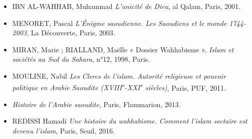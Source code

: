 \begin{itemize}
\item
 
  IBN AL-WAHHAB, Muhammad \emph{L'unicité de Dieu}, al Qalam, Paris,
  2001.
 


 \item
MENORET, Pascal \emph{L'Énigme saoudienne. Les Saoudiens et le monde
1744-2003}, La Découverte, Paris, 2003.
\item
MIRAN, Marie ; RIALLAND, Maëlle « Dossier Wahhabisme », \emph{Islam et
sociétés au Sud du Sahara}, n°12, 1998, Paris.
\item
MOULINE, Nabil \emph{Les Clercs de l'islam. Autorité religieuse et
pouvoir politique en Arabie Saoudite
(XVIII\textsuperscript{e}-XXI\textsuperscript{e} siècles)}, Paris, PUF,
2011.
\item
  \emph{Histoire de l'Arabie
saoudite}, Paris, Flammarion, 2013.
\item
REDISSI Hamadi \emph{Une histoire du wahhabisme. Comment l'islam
sectaire est devenu l'islam}, Paris, Seuil, 2016.
 \end{itemize}